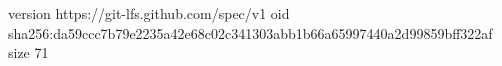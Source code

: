 version https://git-lfs.github.com/spec/v1
oid sha256:da59ccc7b79e2235a42e68c02c341303abb1b66a65997440a2d99859bff322af
size 71
